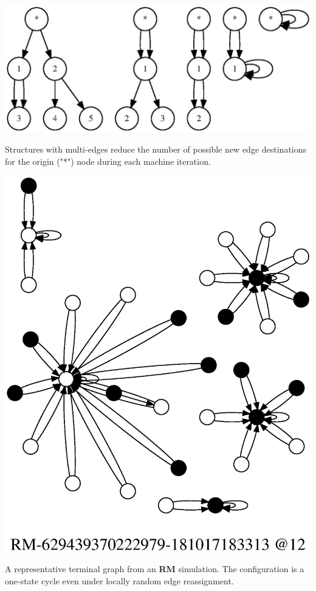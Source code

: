 \documentclass{tufte-handout}
\begin{document}

\begin{marginfigure}
\includegraphics{multiedges.ps}
\caption{Structures with multi-edges reduce the number of possible new edge destinations for
the origin ("*") node during each machine iteration.}
\label{fig:Multiedges}
\end{marginfigure}

\begin{marginfigure}
\includegraphics{terminal_RM_graph.ps}
\caption{A representative terminal graph from an \textbf{RM} simulation. The
configuration is a one-state cycle even under locally random edge reassignment.}
\label{fig:TerminalRMGraph}
\end{marginfigure}
\end{document}
